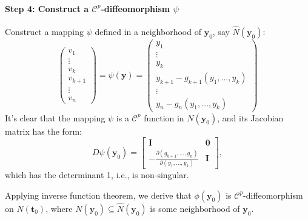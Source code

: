 \paragraph{Step 4: Construct a $\mathcal{C}^p$-diffeomorphism $\psi$}
Construct a mapping $\psi$ defined in a neighborhood of $\bm y_0$, say $\hat N(\bm y_0)$:
\begin{equation}\label{Eq:11:21}
\begin{pmatrix}
v_1\\\vdots\\v_k\\v_{k+1}\\\vdots\\v_n
\end{pmatrix}=\psi(\bm y)=\begin{pmatrix}
y_1\\\vdots\\y_k\\y_{k+1}-g_{k+1}(y_1,\dots,y_k)\\\vdots\\y_n-g_n(y_1,\dots,y_k)
\end{pmatrix}
\end{equation}
It's clear that the mapping $\psi$ is a $\mathcal{C}^p$ function in $N(\bm y_0)$, and its Jacobian matrix has the form:
\[
D\psi(\bm y_0)=\begin{bmatrix}
\bm I&\bm0\\
-\frac{\partial(g_{k+1},\dots,g_n)}{\partial(y_1,\dots,y_k)}&\bm I
\end{bmatrix},
\]
which has the determinant 1, i.e., is non-singular.

Applying inverse function theorem, we derive that $\phi(\bm y_0)$ is $\mathcal{C}^p$-diffeomorphism on $N(\bm t_0)$, where $N(\bm y_0)\subseteq \hat N(\bm y_0)$ is some neighborhood of $\bm y_0$.
